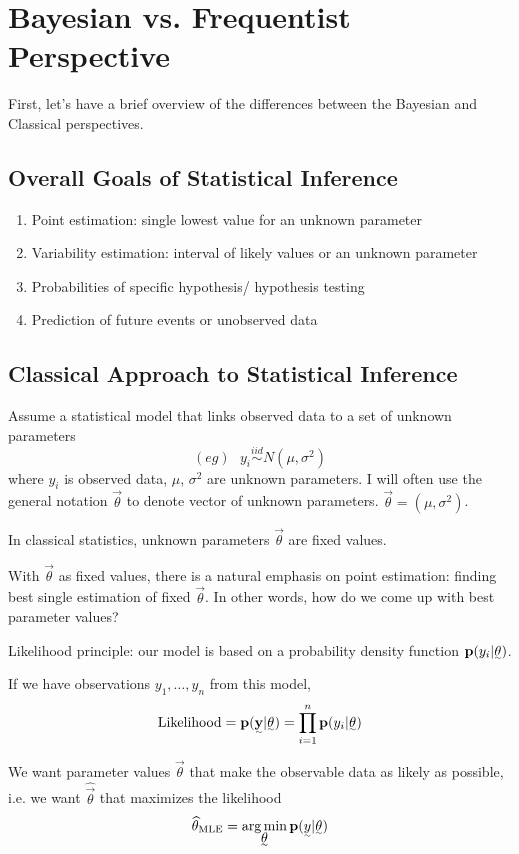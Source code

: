 \section{Bayesian vs. Frequentist Perspective}

First, let's have a brief overview of the differences between the Bayesian and Classical perspectives.

\subsection{Overall Goals of Statistical Inference}

\begin{enumerate}
    \item Point estimation: single lowest value for an unknown parameter
    \item Variability estimation: interval of likely values or an unknown parameter
    \item Probabilities of specific hypothesis/ hypothesis testing
    \item Prediction of future events or unobserved data
\end{enumerate}

\subsection{Classical Approach to Statistical Inference}

Assume a statistical model that links observed data to a set of unknown parameters
\[
(eg) ~~~ y_i \stackrel{iid}{\sim}  N(\mu, \sigma^2)
\]
where $y_i$ is observed data, $\mu$, $\sigma^2$ are unknown parameters. I will often use the general notation $\vec{\theta}$ to denote vector of unknown parameters. $\vec{\theta} = (\mu, \sigma^2)$.

In classical statistics, unknown parameters $\vec{\theta}$ are fixed values.

With $\vec{\theta}$ as fixed values, there is a natural emphasis on point estimation: finding best single estimation of fixed $\vec{\theta}$. In other words, how do we come up with best parameter values?

Likelihood principle: our model is based on a probability density function $\p(y_i| \vec{\theta})$.

If we have observations $y_1, \dots, y_n$ from this model, 
\[
\text{Likelihood} = \p(\vec{\y}| \vec{\theta}) = \prod_{i=1}^n \p(y_i| \vec{\theta})
\]

We want parameter values $\vec{\theta}$ that make the observable data as likely as possible, i.e. we want $\hat{\vec{\theta}}$ that maximizes the likelihood
\[
\hat{\theta}_\text{MLE} = \argmin_{\vec{\theta}} \p(\vec{y} | \vec{\theta})
\]


